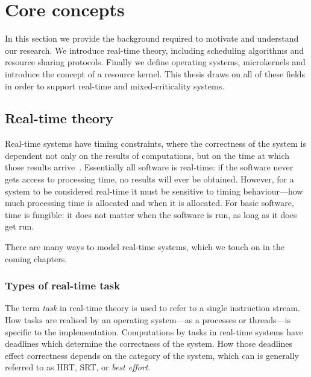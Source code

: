 




\chapter{Core concepts}
\label{chap:background}

In this section we provide the background required to motivate and understand our research.
We introduce real-time theory, including scheduling algorithms and resource sharing protocols.
Finally we define operating systems, microkernels and introduce the concept of a resource kernel.
This thesis draws on all of these fields in order to support real-time and mixed-criticality systems.

\section{Real-time theory}
\label{sec:real-time-theory}

Real-time systems have timing constraints, where the correctness of the system is dependent not only
on the results of computations, but on the time at which those results
arrive~\citep{Stankovic_88}.  Essentially all software is real-time: if the software never gets
access to processing time, no results will ever be obtained.  However, for a system
to be considered real-time it must be sensitive to timing behaviour---how much processing time is
allocated and when it is allocated. For basic software, time is
fungible: it does not matter when the software is run, as long as it does get run.

There are many ways to model real-time systems, which we touch on in the coming chapters. 

\subsection{Types of real-time task}

The term \emph{task} in real-time theory is used to refer to a single instruction stream.  How tasks
are realised by an operating system---as a processes or threads---is specific to the
implementation.  Computations by tasks in real-time systems have deadlines which determine the
correctness of the system. How those deadlines effect correctness depends on the category of the
system, which can is generally referred to as \gls{HRT}, \gls{SRT}, or \emph{best effort}.

